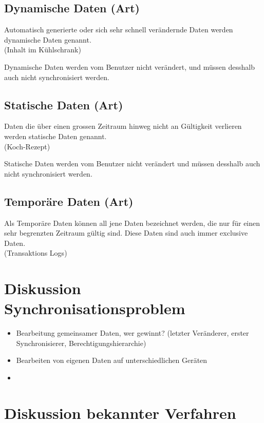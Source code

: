 \documentclass[oneside,11pt,parskip=half,ngerman]{scrreprt}
\begin{document}
\subsection{Dynamische Daten (Art)}\label{dynamische-daten-art}

Automatisch generierte oder sich sehr schnell verändernde Daten werden
dynamische Daten genannt.\\(Inhalt im Kühlschrank)

Dynamische Daten werden vom Benutzer nicht verändert, und müssen
desshalb auch nicht synchronisiert werden.

\subsection{Statische Daten (Art)}\label{statische-daten-art}

Daten die über einen grossen Zeitraum hinweg nicht an Gültigkeit
verlieren werden statische Daten genannt.\\(Koch-Rezept)

Statische Daten werden vom Benutzer nicht verändert und müssen desshalb
auch nicht synchronisiert werden.

\subsection{Temporäre Daten (Art)}\label{temporuxe4re-daten-art}

Als Temporäre Daten können all jene Daten bezeichnet werden, die nur für
einen sehr begrenzten Zeitraum gültig sind. Diese Daten sind auch immer
exclusive Daten.\\(Transaktions Logs)

\section{Diskussion
Synchronisationsproblem}\label{diskussion-synchronisationsproblem}

\begin{itemize}
\item
  Bearbeitung gemeinsamer Daten, wer gewinnt? (letzter Veränderer,
  erster Synchronisierer, Berechtigungshierarchie)
\item
  Bearbeiten von eigenen Daten auf unterschiedlichen Geräten
\item
\end{itemize}

\section{Diskussion bekannter
Verfahren}\label{diskussion-bekannter-verfahren}
\end{document}
